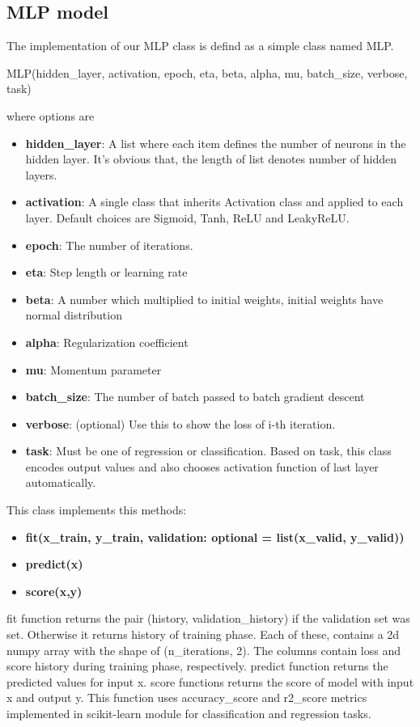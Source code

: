 \documentclass[10pt]{SelfArx} %
\begin{document}
\subsection{MLP model}

The implementation of our MLP class is defind as a simple class named MLP.

\begin{python}
MLP(hidden_layer, activation,
    epoch, eta, beta, alpha, mu,
    batch_size, verbose, task)
\end{python}
where options are
\begin{itemize}
\item \textbf{hidden\_layer}: A list where each item defines the number of neurons in the hidden layer. It's obvious that, the length of list denotes number of hidden layers.
\item \textbf{activation}: A single class that inherits Activation class and applied to each layer. Default choices are Sigmoid, Tanh, ReLU and LeakyReLU.
\item \textbf{epoch}: The number of iterations.
\item \textbf{eta}: Step length or learning rate
\item \textbf{beta}: A number which multiplied to initial weights, initial weights have normal distribution
\item \textbf{alpha}: Regularization coefficient
\item \textbf{mu}: Momentum parameter
\item \textbf{batch\_size}: The number of batch passed to batch gradient descent
\item \textbf{verbose}: (optional) Use this to show the loss of i-th iteration.

\item \textbf{task}: Must be one of regression or classification. Based on task, this class encodes output values and also chooses activation function of last layer automatically.
\end{itemize}
This class implements this methods:
\begin{itemize}
\item  \textbf{fit(x\_train, y\_train, validation: optional = list(x\_valid, y\_valid))}
\item  \textbf{predict(x)}
\item  \textbf{score(x,y)
}
\end{itemize}
fit function returns the pair (history, validation\_history) if the validation set was set. Otherwise it returns history of training phase. Each of these, contains a 2d numpy array with the shape of (n\_iterations, 2). The columns contain loss and score history during training phase, respectively.
predict function returns the predicted values for input x.
score functions returns the score of model with input x and output y. This function uses accuracy\_score and r2\_score metrics implemented in scikit-learn module for classification and regression tasks.
\end{document}

